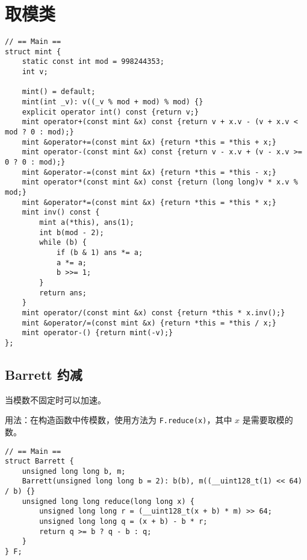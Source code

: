 \section{取模类}

\begin{verbatim}
// == Main ==
struct mint {
    static const int mod = 998244353;
    int v;

    mint() = default;
    mint(int _v): v((_v % mod + mod) % mod) {}
    explicit operator int() const {return v;}
    mint operator+(const mint &x) const {return v + x.v - (v + x.v < mod ? 0 : mod);}
    mint &operator+=(const mint &x) {return *this = *this + x;}
    mint operator-(const mint &x) const {return v - x.v + (v - x.v >= 0 ? 0 : mod);}
    mint &operator-=(const mint &x) {return *this = *this - x;}
    mint operator*(const mint &x) const {return (long long)v * x.v % mod;}
    mint &operator*=(const mint &x) {return *this = *this * x;}
    mint inv() const {
        mint a(*this), ans(1);
        int b(mod - 2);
        while (b) {
            if (b & 1) ans *= a;
            a *= a;
            b >>= 1;
        }
        return ans;
    }
    mint operator/(const mint &x) const {return *this * x.inv();}
    mint &operator/=(const mint &x) {return *this = *this / x;}
    mint operator-() {return mint(-v);}
};
\end{verbatim}

\subsection{Barrett 约减}

当模数不固定时可以加速。

用法：在构造函数中传模数，使用方法为 \lstinline|F.reduce(x)|，其中 $x$ 是需要取模的数。

\begin{verbatim}
// == Main ==
struct Barrett {
    unsigned long long b, m;
    Barrett(unsigned long long b = 2): b(b), m((__uint128_t(1) << 64) / b) {}
    unsigned long long reduce(long long x) {
        unsigned long long r = (__uint128_t(x + b) * m) >> 64;
        unsigned long long q = (x + b) - b * r;
        return q >= b ? q - b : q;
    }
} F;
\end{verbatim}
